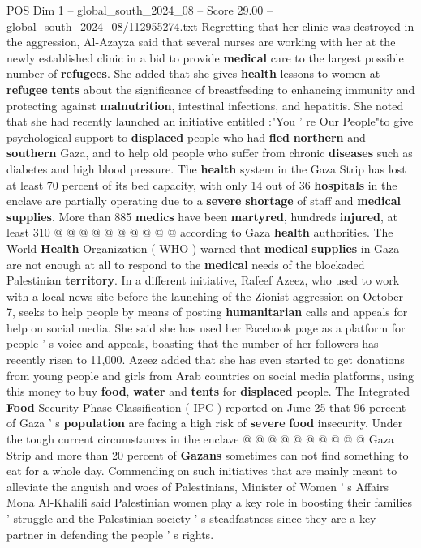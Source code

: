 \begin{textsample}{POS Dim 1 – global\_south\_2024\_08 – Score 29.00 – global\_south\_2024\_08/112955274.txt}
Regretting that her clinic was destroyed in the aggression, Al-Azayza said that several nurses are working with her at the newly established clinic in a bid to provide \textbf{medical} care to the largest possible number of \textbf{refugees}.
She added that she gives \textbf{health} lessons to women at \textbf{refugee} \textbf{tents} about the significance of breastfeeding to enhancing immunity and protecting against \textbf{malnutrition}, intestinal infections, and hepatitis.
She noted that she had recently launched an initiative entitled :"You ' re Our People"to give psychological support to \textbf{displaced} people who had \textbf{fled} \textbf{northern} and \textbf{southern} Gaza, and to help old people who suffer from chronic \textbf{diseases} such as diabetes and high blood pressure.
The \textbf{health} system in the Gaza Strip has lost at least 70 percent of its bed capacity, with only 14 out of 36 \textbf{hospitals} in the enclave are partially operating due to a \textbf{severe} \textbf{shortage} of staff and \textbf{medical} \textbf{supplies}.
More than 885 \textbf{medics} have been \textbf{martyred}, hundreds \textbf{injured}, at least 310 @ @ @ @ @ @ @ @ @ @ according to Gaza \textbf{health} authorities.
The World \textbf{Health} Organization ( WHO ) warned that \textbf{medical} \textbf{supplies} in Gaza are not enough at all to respond to the \textbf{medical} needs of the blockaded Palestinian \textbf{territory}.
In a different initiative, Rafeef Azeez, who used to work with a local news site before the launching of the Zionist aggression on October 7, seeks to help people by means of posting \textbf{humanitarian} calls and appeals for help on social media.
She said she has used her Facebook page as a platform for people ' s voice and appeals, boasting that the number of her followers has recently risen to 11,000.
Azeez added that she has even started to get donations from young people and girls from Arab countries on social media platforms, using this money to buy \textbf{food}, \textbf{water} and \textbf{tents} for \textbf{displaced} people.
The Integrated \textbf{Food} Security Phase Classification ( IPC ) reported on June 25 that 96 percent of Gaza ' s \textbf{population} are facing a high risk of \textbf{severe} \textbf{food} insecurity.
Under the tough current circumstances in the enclave @ @ @ @ @ @ @ @ @ @ Gaza Strip and more than 20 percent of \textbf{Gazans} sometimes can not find something to eat for a whole day.
Commending on such initiatives that are mainly meant to alleviate the anguish and woes of Palestinians, Minister of Women ' s Affairs Mona Al-Khalili said Palestinian women play a key role in boosting their families ' struggle and the Palestinian society ' s steadfastness since they are a key partner in defending the people ' s rights.

\end{textsample}
